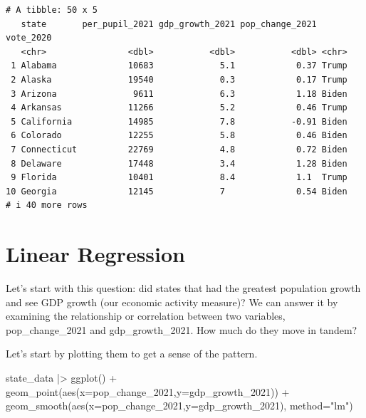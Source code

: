 \documentclass[
  letterpaper,
  DIV=11,
  numbers=noendperiod]{scrreprt}
\newenvironment{Shaded}{\begin{snugshade}}{\end{snugshade}}
\newcommand{\AttributeTok}[1]{\textcolor[rgb]{0.40,0.45,0.13}{#1}}
\newcommand{\FunctionTok}[1]{\textcolor[rgb]{0.28,0.35,0.67}{#1}}
\newcommand{\NormalTok}[1]{\textcolor[rgb]{0.00,0.23,0.31}{#1}}
\newcommand{\SpecialCharTok}[1]{\textcolor[rgb]{0.37,0.37,0.37}{#1}}
\newcommand{\StringTok}[1]{\textcolor[rgb]{0.13,0.47,0.30}{#1}}
\begin{document}
\begin{verbatim}
# A tibble: 50 x 5
   state       per_pupil_2021 gdp_growth_2021 pop_change_2021 vote_2020
   <chr>                <dbl>           <dbl>           <dbl> <chr>    
 1 Alabama              10683             5.1            0.37 Trump    
 2 Alaska               19540             0.3            0.17 Trump    
 3 Arizona               9611             6.3            1.18 Biden    
 4 Arkansas             11266             5.2            0.46 Trump    
 5 California           14985             7.8           -0.91 Biden    
 6 Colorado             12255             5.8            0.46 Biden    
 7 Connecticut          22769             4.8            0.72 Biden    
 8 Delaware             17448             3.4            1.28 Biden    
 9 Florida              10401             8.4            1.1  Trump    
10 Georgia              12145             7              0.54 Biden    
# i 40 more rows
\end{verbatim}


\hypertarget{linear-regression}{%
\chapter{Linear Regression}\label{linear-regression}}

Let's start with this question: did states that had the greatest
population growth and see GDP growth (our economic activity measure)? We
can answer it by examining the relationship or correlation between two
variables, pop\_change\_2021 and gdp\_growth\_2021. How much do they
move in tandem?

Let's start by plotting them to get a sense of the pattern.

\begin{Shaded}
\begin{Highlighting}[]
\NormalTok{state\_data }\SpecialCharTok{|\textgreater{}}
  \FunctionTok{ggplot}\NormalTok{() }\SpecialCharTok{+}
  \FunctionTok{geom\_point}\NormalTok{(}\FunctionTok{aes}\NormalTok{(}\AttributeTok{x=}\NormalTok{pop\_change\_2021,}\AttributeTok{y=}\NormalTok{gdp\_growth\_2021)) }\SpecialCharTok{+}
  \FunctionTok{geom\_smooth}\NormalTok{(}\FunctionTok{aes}\NormalTok{(}\AttributeTok{x=}\NormalTok{pop\_change\_2021,}\AttributeTok{y=}\NormalTok{gdp\_growth\_2021), }\AttributeTok{method=}\StringTok{"lm"}\NormalTok{)}
\end{Highlighting}
\end{Shaded}
\end{document}
